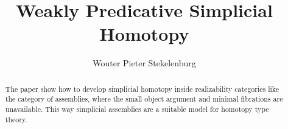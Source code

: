 \documentclass{tac}
\title{Weakly Predicative Simplicial Homotopy}
\author{Wouter Pieter Stekelenburg}\copyrightyear{2015}
\newcommand\hide[1]{}
\begin{document}
\begin{abstract} The paper show how to develop simplicial homotopy inside realizability categories like the category of assemblies, where the small object argument and minimal fibrations are unavailable. This way simplicial assemblies are a suitable model for homotopy type theory.\end{abstract}

\hide{
Three papers:
-simplicial homotopy
-complete categories [how they are preserved]
-the realizability model of HOTT [how to get  fibrant object out of a category]

Idee: reverse the order. definitions--theorem--lemmas. That way the purpose of the lemmas is set up from the start.
}

\maketitle

\hide{
Thorough investigation of the background. If we have an ELCCC then the poset-reflection is a Heyting algebra. The reindexing morphisms between the poset reflections are Heyting algebra morphisms and its adjoints remain adjoints.

}
\end{document}
